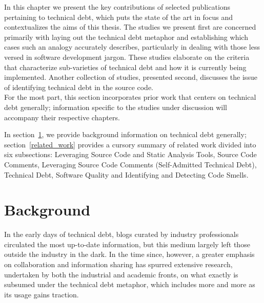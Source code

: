 


In this chapter we present the key contributions of selected publications pertaining to technical debt, which puts the state of the art in focus and contextualizes the aims of this thesis.  The studies we present first are concerned primarily with laying out the technical debt metaphor and establishing which cases such an analogy accurately describes, particularly in dealing with those less versed in software development jargon.  These studies elaborate on the criteria that characterize sub-varieties of technical debt and how it is currently being implemented.  Another collection of studies, presented second, discusses the issue of identifying technical debt in the source code.\\

For the most part, this section incorporates prior work that centers on technical debt generally; information specific to the studies under discussion will accompany their respective chapters.


In section~\ref{background}, we provide background information on technical debt generally; section~\ref{related_work}  provides a cursory summary of related work divided into six subsections: Leveraging Source Code and Static Analysis Tools, Source Code Comments, Leveraging Source Code Comments (Self-Admitted Technical Debt), Technical Debt, Software Quality and Identifying and Detecting Code Smells.

\section{Background}
\label{background}

In the early days of technical debt, blogs curated by industry professionals circulated the most up-to-date information, but this medium largely left those outside the industry in the dark. In the time since, however, a greater emphasis on collaboration and information sharing has spurred extensive research, undertaken by both the industrial and academic fronts, on what exactly is subsumed under the technical debt metaphor, which includes more and more as its usage gains traction.\\

